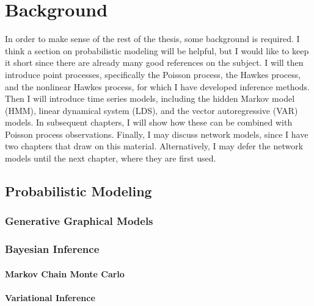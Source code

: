 
\chapter{Background}
In order to make sense of the rest of the thesis, some background is required. 
I think a section on probabilistic modeling will be helpful, but I would 
like to keep it short since there are already many good references on the 
subject. I will then introduce point processes, specifically the Poisson 
process, the Hawkes process, and the nonlinear Hawkes process, for which 
I have developed inference methods. Then I will introduce time series 
models, including the hidden Markov model (HMM), linear dynamical system (LDS),
and the vector autoregressive (VAR) models. In subsequent chapters, I 
will show how these can be combined with Poisson process observations.
Finally, I may discuss network models, since I have two chapters that draw 
on this material. Alternatively, I may defer the network models until 
the next chapter, where they are first used.

\section{Probabilistic Modeling}

\subsection{Generative Graphical Models}

\subsection{Bayesian Inference}

\subsubsection{Markov Chain Monte Carlo}

\subsubsection{Variational Inference}

